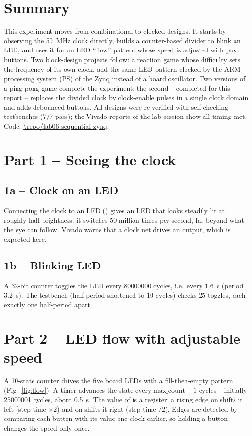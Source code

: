 
\newcommand{\ReportShortTitle}{Experiment 6 -- Sequential logic, clocking and the Zynq PS}


\section*{Summary}
This experiment moves from combinational to clocked designs. It starts by observing the
\SI{50}{MHz} clock directly, builds a counter-based divider to blink an LED, and uses it for an LED
``flow'' pattern whose speed is adjusted with push buttons. Two block-design projects follow: a reaction
game whose difficulty sets the frequency of its own clock, and the same LED pattern clocked by the ARM
processing system (PS) of the Zynq instead of a board oscillator. Two versions of a ping-pong game
complete the experiment; the second -- completed for this report -- replaces the divided clock by
clock-enable pulses in a single clock domain and adds debounced buttons. All designs were re-verified with self-checking testbenches (7/7 pass); the Vivado reports of
the lab session show all timing met. Code: \url{\repo/lab06-sequential-zynq}.

\section{Part 1 -- Seeing the clock}
\subsection{1a -- Clock on an LED}
Connecting the clock to an LED () gives an LED that looks steadily lit at roughly
half brightness: it switches \num{50} million times per second, far beyond what the eye can follow.
Vivado warns that a clock net drives an output, which is expected here.

\subsection{1b -- Blinking LED}
A 32-bit counter toggles the LED every \num{80000000} cycles, i.e.\ every \SI{1.6}{s}
(period \SI{3.2}{s}). The testbench (half-period shortened to 10 cycles) checks 25 toggles, each exactly
one half-period apart.

\section{Part 2 -- LED flow with adjustable speed}
A 10-state counter drives the five board LEDs with a fill-then-empty pattern (Fig.~\ref{fig:flow}).
A timer advances the state every $\text{max\_count}+1$ cycles -- initially \num{25000001} cycles,
about \SI{0.5}{s}. The value of  is a register: a rising edge on  shifts it
left (step time $\times2$) and on  shifts it right (step time $/2$). Edges are detected by
comparing each button with its value one clock earlier, so holding a button changes the speed only once.

